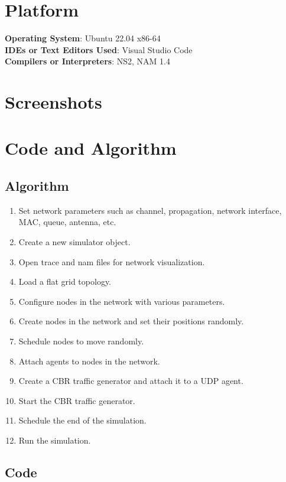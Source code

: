 \documentclass[11pt]{article}
\begin{document}
\section{Platform}
\textbf{Operating System}: Ubuntu 22.04 x86-64 \\
\textbf{IDEs or Text Editors Used}: Visual Studio Code\\
\textbf{Compilers or Interpreters}: NS2, NAM 1.4\\

\section{Screenshots}


\section{Code and Algorithm}
\subsection{Algorithm}
\begin{enumerate}
    \item Set network parameters such as channel, propagation, network interface, MAC, queue, antenna, etc.
    \item Create a new simulator object.
    \item Open trace and nam files for network visualization.
    \item Load a flat grid topology.
    \item Configure nodes in the network with various parameters.
    \item Create nodes in the network and set their positions randomly.
    \item Schedule nodes to move randomly.
    \item Attach agents to nodes in the network.
    \item Create a CBR traffic generator and attach it to a UDP agent.
    \item Start the CBR traffic generator.
    \item Schedule the end of the simulation.
    \item Run the simulation.
\end{enumerate}

\subsection{Code}
\end{document}
